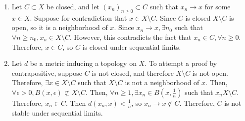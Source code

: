 \begin{myproof}
	\begin{enumerate}
		\item Let $C\subset X$ be closed, and let $(x_n)_{n\geq 0}\subset C$ such that $x_n\to x$ for some $x\in X$. Suppose for contradiction that $x\in X\setminus C$. Since $C$ is closed $X\setminus C$ is open, so it is a neighborhood of $x$. Since $x_n\to x, \exists n_0$ such that $\forall n\geq n_0, x_n\in X\setminus C$. However, this contradicts the fact that $x_n\in C, \forall n\geq 0$. Therefore, $x\in C$, so $C$ is closed under sequential limits.
		\item Let $d$ be a metric inducing a topology on $X$. To attempt a proof by contrapositive, suppose $C$ is not closed, and therefore $X\setminus C$ is not open. Therefore, $\exists x\in X\setminus C$ such that $X\setminus C$ is not a neighborhood of $x$. Then, $\forall \epsilon > 0, B(x,\epsilon)\not\subset X\setminus C$. Then, $\forall n\geq 1, \exists x_n \in B(x,\frac{1}{n})$ such that $x_n X\setminus C$. Therefore, $x_n\in C$. Then $d(x_n,x)<\frac{1}{n}$, so $x_n\to x\not\in C$. Therefore, $C$ is not stable under sequential limits.
	\end{enumerate}
\end{myproof}


